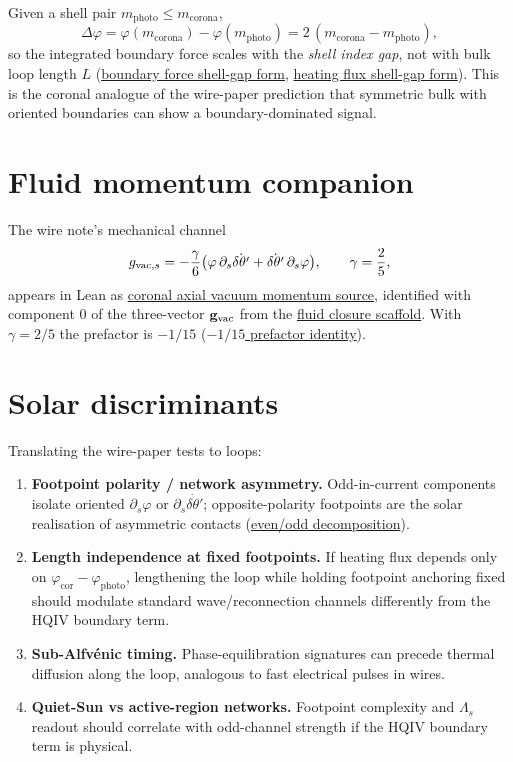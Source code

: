 \documentclass[11pt]{amsart}
\begin{document}
Given a shell pair $m_{\mathrm{photo}}\le m_{\mathrm{corona}}$,
\[
\Delta\varphi
  = \varphi(m_{\mathrm{corona}})-\varphi(m_{\mathrm{photo}})
  = 2\,(m_{\mathrm{corona}}-m_{\mathrm{photo}}),
\]
so the integrated boundary force scales with the \emph{shell index gap}, not
with bulk loop length $L$
(\hyperref[lean:shell-gap-force]{boundary force shell-gap form},
\hyperref[lean:shell-gap-flux]{heating flux shell-gap form}).
This is the coronal analogue of the wire-paper prediction that symmetric bulk
with oriented boundaries can show a boundary-dominated signal.

\section{Fluid momentum companion}
\label{sec:fluid}

The wire note's mechanical channel
\[
g_{{\rm vac},s}
  =
  -\frac{\gamma}{6}
  \bigl(\varphi\,\partial_s\dot{\delta\theta'}
        +\dot{\delta\theta'}\,\partial_s\varphi\bigr),
\qquad \gamma=\frac25,
\]
appears in Lean as \hyperref[lean:vacuum-momentum]{coronal axial vacuum
momentum source}, identified with component $0$ of the three-vector
$\mathbf g_{\rm vac}$ from the \hyperref[lean:fluid-scaffold]{fluid closure
scaffold}. With $\gamma=2/5$ the prefactor is $-1/15$
(\hyperref[lean:minus-fifteenth]{$-1/15$ prefactor identity}).

\section{Solar discriminants}
\label{sec:discriminants}

Translating the wire-paper tests to loops:

\begin{enumerate}[leftmargin=2em]
\item \textbf{Footpoint polarity / network asymmetry.}
  Odd-in-current components isolate oriented $\partial_s\varphi$ or
  $\partial_s\dot{\delta\theta'}$; opposite-polarity footpoints are the solar
  realisation of asymmetric contacts
  (\hyperref[lean:even-odd]{even/odd decomposition}).
\item \textbf{Length independence at fixed footpoints.}
  If heating flux depends only on $\varphi_{\mathrm{cor}}-\varphi_{\mathrm{photo}}$,
  lengthening the loop while holding footpoint anchoring fixed should modulate
  standard wave/reconnection channels differently from the HQIV boundary term.
\item \textbf{Sub-Alfv\'enic timing.}
  Phase-equilibration signatures can precede thermal diffusion along the loop,
  analogous to fast electrical pulses in wires.
\item \textbf{Quiet-Sun vs active-region networks.}
  Footpoint complexity and $\Lambda_s$ readout should correlate with odd-channel
  strength if the HQIV boundary term is physical.
\end{enumerate}
\end{document}
